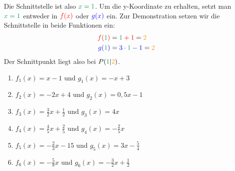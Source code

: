 Die Schnittstelle ist also \(\textcolor{ForestGreen}{x=1}\). Um die y-Koordinate zu erhalten, setzt man \(\textcolor{ForestGreen}{x=1}\) entweder in \(\textcolor{red}{f(x)}\) oder \(\textcolor{blue}{g(x)}\) ein. Zur Demonstration setzen wir die Schnittstelle in beide Funktionen ein:
\begin{align*}
	\textcolor{red}{f(}\textcolor{ForestGreen}{1}\textcolor{red}{)}&=\textcolor{red}{\textcolor{ForestGreen}{1}+1}=\textcolor{YellowOrange}{2}\\
	\textcolor{blue}{g(}\textcolor{ForestGreen}{1}\textcolor{blue}{)}&=\textcolor{blue}{3\cdot \textcolor{ForestGreen}{1}-1}=\textcolor{YellowOrange}{2}
\end{align*}
Der Schnittpunkt liegt also bei \(P\left(\textcolor{ForestGreen}{1}\middle\vert\textcolor{YellowOrange}{2}\right)\).
\begin{Exercise}[title={Bestimme jeweils den Schnittpunkt}, label=schnittpunktA1]

	\begin{minipage}{0.5\textwidth}
		\begin{enumerate}[label=\alph*)]
			\item \(f_1(x)=x-1\text{ und }g_1(x)=-x+3\)
			\item \(f_2(x)=-2x+4\text{ und }g_2(x)=0,5x-1\)
			\item \(f_3(x)=\frac{3}{2}x+\frac{1}{2}\text{ und }g_3(x)=4x\)
		\end{enumerate}
	\end{minipage}%
	\begin{minipage}{0.5\textwidth}
		\begin{enumerate}[label=\alph*)]
			\setcounter{enumi}{3}
			\item \(f_4(x)=\frac{4}{5}x+\frac{2}{5}\text{ und }g_4(x)=-\frac{2}{5}x\)
			\item \(f_5(x)=-\frac{2}{3}x-15\text{ und }g_5(x)=3x-\frac{5}{4}\)
			\item \(f_6(x)=-\frac{5}{8}x\text{ und }g_6(x)=-\frac{3}{2}x+\frac{1}{2}\)
		\end{enumerate}
	\end{minipage}%
\end{Exercise}\vspace{.5cm}
